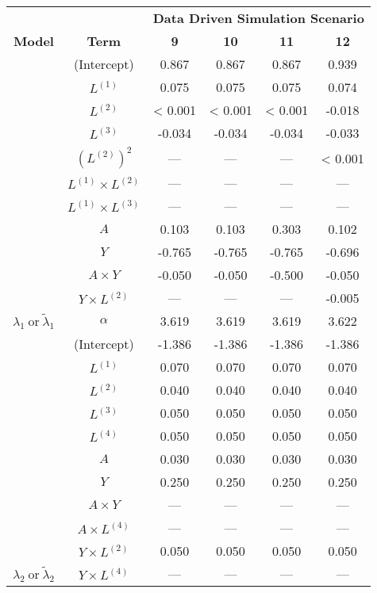 \begin{table}
\begin{minipage}[t]{0.5\textwidth}
\begin{tabular}[t]{|>{}c|c|c|c|c|>{}c|}
\hline
\multicolumn{1}{|c|}{\textbf{ }} & \multicolumn{1}{|c|}{\textbf{ }} & \multicolumn{4}{|c|}{\textbf{Data Driven Simulation Scenario}} \\
\cline{3-6}
\textbf{Model} & \textbf{Term} & \textbf{9} & \textbf{10} & \textbf{11} & \textbf{12}\\
\hline
 & (Intercept) & 0.867 & 0.867 & 0.867 & 0.939\\
\cline{2-6}
 & $L^{(1)}$ & 0.075 & 0.075 & 0.075 & 0.074\\
\cline{2-6}
 & $L^{(2)}$ & < 0.001 & < 0.001 & < 0.001 & -0.018\\
\cline{2-6}
 & $L^{(3)}$ & -0.034 & -0.034 & -0.034 & -0.033\\
\cline{2-6}
 & $(L^{(2)})^2$ & --- & --- & --- & < 0.001\\
\cline{2-6}
 & $L^{(1)} \times L^{(2)}$ & --- & --- & --- & ---\\
\cline{2-6}
 & $L^{(1)} \times L^{(3)}$ & --- & --- & --- & ---\\
\cline{2-6}
 & $A$ & 0.103 & 0.103 & 0.303 & 0.102\\
\cline{2-6}
 & $Y$ & -0.765 & -0.765 & -0.765 & -0.696\\
\cline{2-6}
 & $A\times Y$ & -0.050 & -0.050 & -0.500 & -0.050\\
\cline{2-6}
 & $Y \times L^{(2)}$ & --- & --- & --- & -0.005\\
\cline{2-6}
\multirow{-12}{*}{\centering\arraybackslash $\lambda_1~\text{or}~\tilde\lambda_1$} & $\alpha$ & 3.619 & 3.619 & 3.619 & 3.622\\
\cline{1-6}
 & (Intercept) & -1.386 & -1.386 & -1.386 & -1.386\\
\cline{2-6}
 & $L^{(1)}$ & 0.070 & 0.070 & 0.070 & 0.070\\
\cline{2-6}
 & $L^{(2)}$ & 0.040 & 0.040 & 0.040 & 0.040\\
\cline{2-6}
 & $L^{(3)}$ & 0.050 & 0.050 & 0.050 & 0.050\\
\cline{2-6}
 & $L^{(4)}$ & 0.050 & 0.050 & 0.050 & 0.050\\
\cline{2-6}
 & $A$ & 0.030 & 0.030 & 0.030 & 0.030\\
\cline{2-6}
 & $Y$ & 0.250 & 0.250 & 0.250 & 0.250\\
\cline{2-6}
 & $A\times Y$ & --- & --- & --- & ---\\
\cline{2-6}
 & $A \times L^{(4)}$ & --- & --- & --- & ---\\
\cline{2-6}
 & $Y \times L^{(2)}$ & 0.050 & 0.050 & 0.050 & 0.050\\
\cline{2-6}
\multirow{-11}{*}{\centering\arraybackslash $\lambda_2~\text{or}~\tilde\lambda_2$} & $Y \times L^{(4)}$ & --- & --- & --- & ---\\
\hline
\end{tabular}
\end{minipage}
\end{table}



